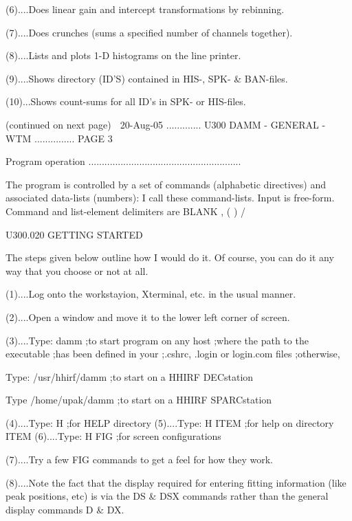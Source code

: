    (6)....Does linear gain and intercept transformations by rebinning.
 
   (7)....Does crunches (sums a specified number of channels together).
 
   (8)....Lists and plots 1-D histograms on the line printer.
 
   (9)....Shows directory (ID'S) contained in HIS-, SPK- & BAN-files.
 
   (10)...Shows count-sums for all ID's in SPK- or HIS-files.
 
 
                            (continued on next page)
    
   20-Aug-05 ............. U300  DAMM - GENERAL - WTM ............... PAGE   3
 
   Program operation .........................................................
 
   The program is controlled by a set of commands (alphabetic directives)  and
   associated  data-lists  (numbers):  I  call  these  command-lists. Input is
   free-form. Command and list-element delimiters are BLANK , ( ) /
 
   U300.020  GETTING STARTED
 
   The steps given below outline how I would do it. Of course, you can  do  it
   any way that you choose or not at all.
 
   (1)....Log onto the workstayion, Xterminal, etc. in the usual manner.
 
   (2)....Open a window and move it to the lower left corner of screen.
 
 
   (3)....Type:  damm                ;to start program on any host
                                     ;where the path to the executable
                                     ;has been defined in your
                                     ;.cshrc, .login or login.com files
                                     ;otherwise,
 
          Type:  /usr/hhirf/damm     ;to start on a HHIRF DECstation
 
          Type   /home/upak/damm     ;to start on a HHIRF SPARCstation
 
   (4)....Type:  H                   ;for HELP directory
   (5)....Type:  H  ITEM             ;for help on directory ITEM
   (6)....Type:  H  FIG              ;for screen configurations
 
   (7)....Try a few FIG commands to get a feel for how they work.
 
   (8)....Note  the  fact  that  the  display  required  for  entering fitting
          information (like peak positions, etc) is via the DS & DSX  commands
          rather than the general display commands D & DX.
 
